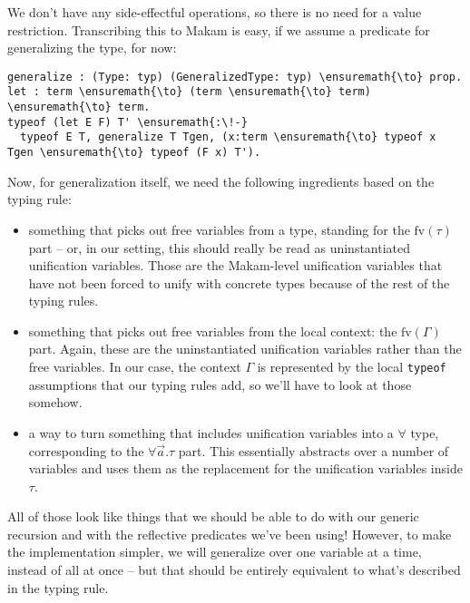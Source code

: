 \vspace{-1.2em}\begin{mathpar}
\end{mathpar}

We don't have any side-effectful operations, so there is no need for a
value restriction. Transcribing this to Makam is easy, if we assume a
predicate for generalizing the type, for now:

\begin{verbatim}
generalize : (Type: typ) (GeneralizedType: typ) \ensuremath{\to} prop.
let : term \ensuremath{\to} (term \ensuremath{\to} term) \ensuremath{\to} term.
typeof (let E F) T' \ensuremath{:\!-}
  typeof E T, generalize T Tgen, (x:term \ensuremath{\to} typeof x Tgen \ensuremath{\to} typeof (F x) T').
\end{verbatim}

Now, for generalization itself, we need the following ingredients based
on the typing rule:

\begin{itemize}
\tightlist
\item
  something that picks out free variables from a type, standing for the
  \(\text{fv}(\tau)\) part -- or, in our setting, this should really be
  read as uninstantiated unification variables. Those are the
  Makam-level unification variables that have not been forced to unify
  with concrete types because of the rest of the typing rules.
\item
  something that picks out free variables from the local context: the
  \(\text{fv}(\Gamma)\) part. Again, these are the uninstantiated
  unification variables rather than the free variables. In our case, the
  context \(\Gamma\) is represented by the local \texttt{typeof}
  assumptions that our typing rules add, so we'll have to look at those
  somehow.
\item
  a way to turn something that includes unification variables into a
  \(\forall\) type, corresponding to the \(\forall \vec{a}.\tau\) part.
  This essentially abstracts over a number of variables and uses them as
  the replacement for the unification variables inside \(\tau\).
\end{itemize}

All of those look like things that we should be able to do with our
generic recursion and with the reflective predicates we've been using!
However, to make the implementation simpler, we will generalize over one
variable at a time, instead of all at once -- but that should be
entirely equivalent to what's described in the typing rule.

